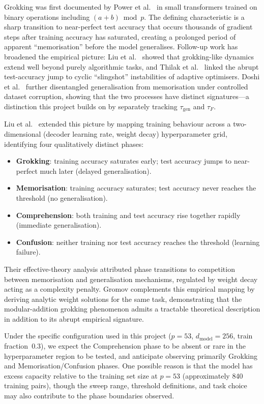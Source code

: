 \documentclass[12pt,openany,oneside,a4paper]{book}
\newcommand{\taug}{\tau_{\mathrm{gen}}}
\newcommand{\tauf}{\tau_{F}}
\begin{document}
Grokking was first documented by Power et al.\ \cite{power2022grokking}
in small transformers trained on binary operations including
$(a+b)\bmod p$.
The defining characteristic is a sharp transition to near-perfect test
accuracy that occurs thousands of gradient steps after training
accuracy has saturated, creating a prolonged period of apparent
``memorisation'' before the model generalises.
Follow-up work has broadened the empirical picture: Liu et al.\
\cite{liu2023omnigrok} showed that grokking-like dynamics extend well
beyond purely algorithmic tasks, and Thilak et al.\
\cite{thilak2022slingshot} linked the abrupt test-accuracy jump to
cyclic ``slingshot'' instabilities of adaptive optimisers.
Doshi et al.\ \cite{doshi2024grok} further disentangled generalisation
from memorisation under controlled dataset corruption, showing that
the two processes have distinct signatures---a distinction this
project builds on by separately tracking $\taug$ and $\tauf$.

Liu et al.\ \cite{liu2022towards} extended this picture by mapping
training behaviour across a two-dimensional (decoder learning rate,
weight decay) hyperparameter grid, identifying four qualitatively
distinct phases:
\begin{itemize}
  \item \textbf{Grokking}: training accuracy saturates early; test
    accuracy jumps to near-perfect much later (delayed generalisation).
  \item \textbf{Memorisation}: training accuracy saturates; test
    accuracy never reaches the threshold (no generalisation).
  \item \textbf{Comprehension}: both training and test accuracy rise
    together rapidly (immediate generalisation).
  \item \textbf{Confusion}: neither training nor test accuracy reaches
    the threshold (learning failure).
\end{itemize}
Their effective-theory analysis attributed phase transitions to
competition between memorisation and generalisation mechanisms,
regulated by weight decay acting as a complexity penalty.
Gromov \cite{gromov2023grokking} complements this empirical mapping
by deriving analytic weight solutions for the same task, demonstrating
that the modular-addition grokking phenomenon admits a tractable
theoretical description in addition to its abrupt empirical signature.

Under the specific configuration used in this project ($p=53$,
$d_{\mathrm{model}}=256$, train fraction~$0.3$), we expect
the Comprehension phase to be absent or rare in the hyperparameter
region to be tested, and anticipate observing primarily Grokking
and Memorisation/Confusion phases.
One possible reason is that the model has excess capacity relative
to the training set size at $p=53$ (approximately 840 training
pairs), though the sweep range, threshold definitions, and task
choice may also contribute to the phase boundaries observed.
\end{document}
